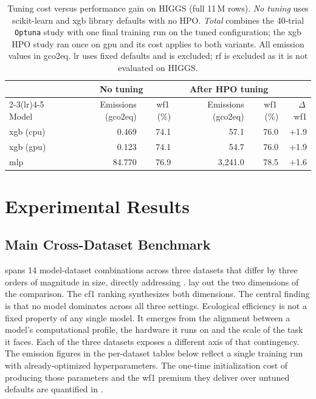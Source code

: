 \begin{table}[htbp]
\centering
\caption[Tuned versus default hyperparameters on HIGGS (11\,M rows).]{Tuning cost versus performance gain on HIGGS (full 11\,M rows). \textit{No tuning} uses scikit-learn and \gls{xgb} library defaults with no HPO. \textit{Total} combines the 40-trial \texttt{Optuna} study with one final training run on the tuned configuration; the \gls{xgb} HPO study ran once on \gls{gpu} and its cost applies to both variants. All emission values in \gls{gco2eq}. \gls{lr} uses fixed defaults and is excluded; \gls{rf} is excluded as it is not evaluated on HIGGS.}
\label{tab:tuned_vs_default}
\begin{tabular}{@{} l r r r r r @{}}
\toprule
 & \multicolumn{2}{c}{No tuning} & \multicolumn{2}{c}{After HPO tuning} \\
\cmidrule(lr){2-3}\cmidrule(lr){4-5}
Model & Emissions (\gls{gco2eq}) & \gls{wf1}\,(\%) & Emissions (\gls{gco2eq}) & \gls{wf1}\,(\%) & $\Delta$\,\gls{wf1} \\
\midrule
\gls{xgb} (\gls{cpu}) &  0.469 & 74.1 &     57.1 & 76.0 & $+$1.9 \\
\gls{xgb} (\gls{gpu}) &  0.123 & 74.1 &     54.7 & 76.0 & $+$1.9 \\
\gls{mlp}            & 84.770 & 76.9 & 3{,}241.0 & 78.5 & $+$1.6 \\
\bottomrule
\end{tabular}
\end{table}


\section{Experimental Results}
\label{sec:experimental_results}

\subsection{Main Cross-Dataset Benchmark}
\label{sec:results_main}

 spans 14 model-dataset combinations across three datasets that differ by three orders of magnitude in size, directly addressing .  lay out the two dimensions of the comparison. The \gls{cf1} ranking synthesizes both dimensions. The central finding is that no model dominates across all three settings. Ecological efficiency is not a fixed property of any single model. It emerges from the alignment between a model's computational profile, the hardware it runs on and the scale of the task it faces. Each of the three datasets exposes a different axis of that contingency. The emission figures in the per-dataset tables below reflect a single training run with already-optimized hyperparameters. The one-time initialization cost of producing those parameters and the \gls{wf1} premium they deliver over untuned defaults are quantified in .

